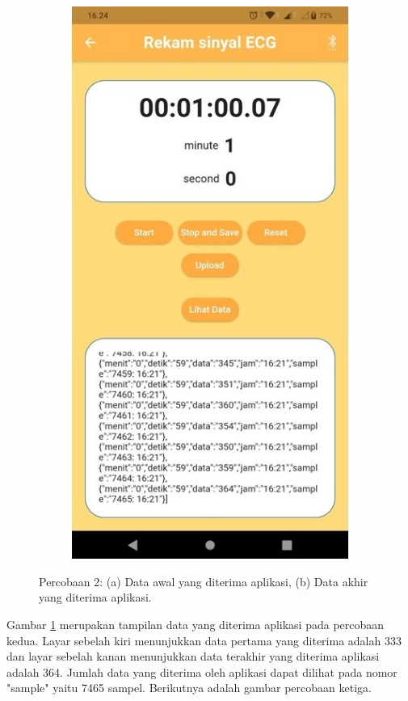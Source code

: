 \begin{figure}[H]
	\begin{subfigure}{0.45\textwidth}
		\centering
		\includegraphics[width=1\linewidth]{img/percob/Slide12b.jpg}	  
		\caption{}		
	\end{subfigure}	
	\caption{Percobaan 2: (a) Data awal yang diterima aplikasi, (b) Data akhir yang diterima aplikasi.}
	\label{fig:4.2.2}
\end{figure}
\vspace{1ex}
Gambar \ref{fig:4.2.2} merupakan tampilan data yang diterima aplikasi pada percobaan kedua. Layar sebelah kiri menunjukkan data pertama yang diterima adalah 333 dan layar sebelah kanan menunjukkan data terakhir yang diterima aplikasi adalah 364. Jumlah data yang diterima oleh aplikasi dapat dilihat pada nomor "sample" yaitu 7465 sampel. Berikutnya adalah gambar percobaan ketiga. 

